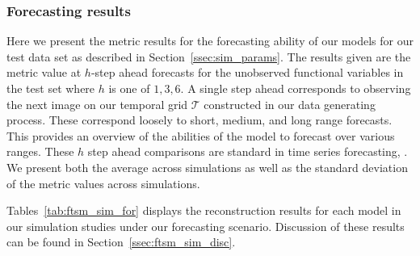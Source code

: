 \subsubsection{Forecasting results}
Here we present the metric results for the forecasting ability of our models for our test data set as described in Section~\ref{ssec:sim_params}.
The results given are the metric value at $h$-step ahead forecasts for the unobserved functional variables in the test set where $h$ is one of $1, 3, 6$.
A single step ahead corresponds to observing the next image on our temporal grid $\mathcal{T}$ constructed in our data generating process. 
These correspond loosely to short, medium, and long range forecasts. 
This provides an overview of the abilities of the model to forecast over various ranges.
These $h$ step ahead comparisons are standard in time series forecasting, \citep{hyndman_forecasting_2018}. 
We present both the average across simulations as well as the standard deviation of the metric values across simulations.

Tables~\ref{tab:ftsm_sim_for} displays the reconstruction results for each model in our simulation studies under our forecasting scenario. 
Discussion of these results can be found in Section~\ref{ssec:ftsm_sim_disc}. 

